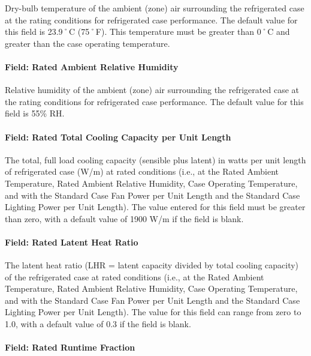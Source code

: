 Dry-bulb temperature of the ambient (zone) air surrounding the refrigerated case at the rating conditions for refrigerated case performance. The default value for this field is 23.9˚C (75˚F). This temperature must be greater than 0˚C and greater than the case operating temperature.

\paragraph{Field: Rated Ambient Relative Humidity}\label{field-rated-ambient-relative-humidity}

Relative humidity of the ambient (zone) air surrounding the refrigerated case at the rating conditions for refrigerated case performance. The default value for this field is 55\% RH.

\paragraph{Field: Rated Total Cooling Capacity per Unit Length}\label{field-rated-total-cooling-capacity-per-unit-length}

The total, full load cooling capacity (sensible plus latent) in watts per unit length of refrigerated case (W/m) at rated conditions (i.e., at the Rated Ambient Temperature, Rated Ambient Relative Humidity, Case Operating Temperature, and with the Standard Case Fan Power per Unit Length and the Standard Case Lighting Power per Unit Length). The value entered for this field must be greater than zero, with a default value of 1900 W/m if the field is blank.

\paragraph{Field: Rated Latent Heat Ratio}\label{field-rated-latent-heat-ratio}

The latent heat ratio (LHR = latent capacity divided by total cooling capacity) of the refrigerated case at rated conditions (i.e., at the Rated Ambient Temperature, Rated Ambient Relative Humidity, Case Operating Temperature, and with the Standard Case Fan Power per Unit Length and the Standard Case Lighting Power per Unit Length). The value for this field can range from zero to 1.0, with a default value of 0.3 if the field is blank.

\paragraph{Field: Rated Runtime Fraction}\label{field-rated-runtime-fraction}

